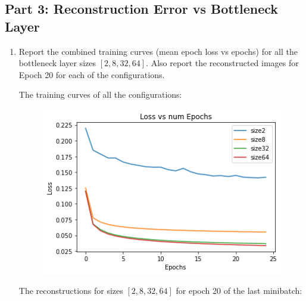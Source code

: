 \subsection{Part 3: Reconstruction Error vs Bottleneck Layer} 
\begin{enumerate}
    \item Report the combined training curves (mean epoch loss vs epochs) for all the bottleneck layer sizes $[2,8,32,64]$. Also report the reconstructed images for Epoch 20 for each of the configurations.
    
    The training curves of all the configurations:

     \begin{figure}[H]
       \centering
         \includegraphics[scale=0.8]{templates/loss1}
     \end{figure}

The reconstructions for sizes $[2,8,32,64]$ for epoch 20 of the last minibatch:


\end{enumerate}

